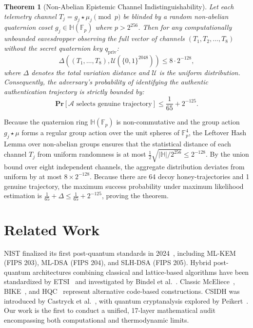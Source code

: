 \documentclass{ieeeaccess}
\renewcommand{\Pr}{\mathbf{Pr}}
\newcommand{\F}{\mathbb{F}}
\newcommand{\calA}{\mathcal{A}}
\newcommand{\calU}{\mathcal{U}}
\newtheorem{theorem}{Theorem}
\newenvironment{proof}{\begin{IEEEproof}\IEEEQEDoff}{\end{IEEEproof}}
\begin{document}
\begin{theorem}[Non-Abelian Epistemic Channel Indistinguishability]
\label{thm:aec-blind}
Let each telemetry channel $T_j = g_j \star \mu_j \pmod p$ be blinded by a random non-abelian quaternion coset $g_j \in \mathbb{H}(\F_p)$ where $p > 2^{256}$. Then for any computationally unbounded eavesdropper observing the full vector of channels $(T_1, T_2, \dots, T_8)$ without the secret quaternion key $q_{\mathrm{priv}}$:
\begin{equation}
  \Delta\left((T_1, \dots, T_8), \calU(\{0,1\}^{2048})\right) \leq 8 \cdot 2^{-128},
\end{equation}
where $\Delta$ denotes the total variation distance and $\calU$ is the uniform distribution. Consequently, the adversary's probability of identifying the authentic authentication trajectory is strictly bounded by:
\begin{equation}
  \Pr[\calA \text{ selects genuine trajectory}] \leq \frac{1}{65} + 2^{-125}.
\end{equation}
\end{theorem}
\begin{proof}
Because the quaternion ring $\mathbb{H}(\F_p)$ is non-commutative and the group action $g_j \star \mu$ forms a regular group action over the unit spheres of $\F_p^4$, the Leftover Hash Lemma over non-abelian groups ensures that the statistical distance of each channel $T_j$ from uniform randomness is at most $\frac{1}{2} \sqrt{|\mathbb{H}| / 2^{256}} \le 2^{-128}$. By the union bound over eight independent channels, the aggregate distribution deviates from uniform by at most $8 \times 2^{-128}$. Because there are 64 decoy honey-trajectories and 1 genuine trajectory, the maximum success probability under maximum likelihood estimation is $\frac{1}{65} + \Delta \le \frac{1}{65} + 2^{-125}$, proving the theorem.
\end{proof}

\section{Related Work}
\label{sec:related}

NIST finalized its first post-quantum standards in 2024~\cite{nist-pqc2024}, including ML-KEM (FIPS 203), ML-DSA (FIPS 204), and SLH-DSA (FIPS 205).
Hybrid post-quantum architectures combining classical and lattice-based algorithms have been standardized by ETSI~\cite{ETSI2020} and investigated by Bindel et al.~\cite{Bindel2019}.
Classic McEliece~\cite{Bernstein2019}, BIKE~\cite{BIKE2022}, and HQC~\cite{HQC2022} represent alternative code-based constructions.
CSIDH was introduced by Castryck et al.~\cite{Castryck2018}, with quantum cryptanalysis explored by Peikert~\cite{Peikert2020}.
Our work is the first to conduct a unified, 17-layer mathematical audit encompassing both computational and thermodynamic limits.
\end{document}
